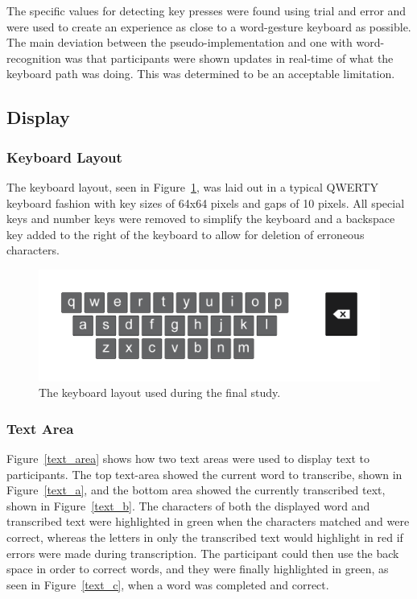 The specific values for detecting key presses were found using trial and error and were used to create an experience as close to a word-gesture keyboard as possible. The main deviation between the pseudo-implementation and one with word-recognition was that participants were shown updates in real-time of what the keyboard path was doing. This was determined to be an acceptable limitation.

\subsection{Display}
\subsubsection{Keyboard Layout}
The keyboard layout, seen in Figure~\ref{keyboard_layout}, was laid out in a typical QWERTY keyboard fashion with key sizes of 64x64 pixels and gaps of 10 pixels. All special keys and number keys were removed to simplify the keyboard and a backspace key added to the right of the keyboard to allow for deletion of erroneous characters.

\begin{figure}[h]
	\centering
	\includegraphics[width=6in]{fig_final_keyboard}
	\caption[Display: Keyboard Layout]{The keyboard layout used during the final study.}
	\label{keyboard_layout}
\end{figure}

\subsubsection{Text Area}
Figure~\ref{text_area} shows how two text areas were used to display text to participants. The top text-area showed the current word to transcribe, shown in Figure~\ref{text_a}, and the bottom area showed the currently transcribed text, shown in Figure~\ref{text_b}. The characters of both the displayed word and transcribed text were highlighted in green when the characters matched and were correct, whereas the letters in only the transcribed text would highlight in red if errors were made during transcription. The participant could then use the back space in order to correct words, and they were finally highlighted in green, as seen in Figure~\ref{text_c}, when a word was completed and correct.

